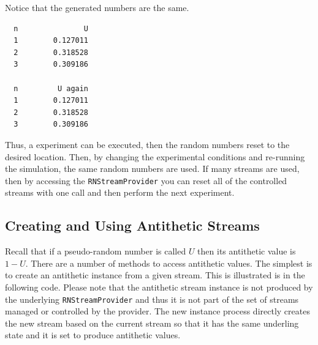 \documentclass[
]{book}
\theoremstyle{definition}
\theoremstyle{definition}
\theoremstyle{definition}
\theoremstyle{definition}
\theoremstyle{remark}
\begin{document}
Notice that the generated numbers are the same.

\begin{verbatim}
  n               U 
  1        0.127011 
  2        0.318528 
  3        0.309186 

  n         U again 
  1        0.127011 
  2        0.318528 
  3        0.309186 
\end{verbatim}

Thus, a experiment can be executed, then the random numbers reset to the desired location. Then, by changing the experimental conditions and re-running the simulation, the same random numbers are used. If many streams are used, then by accessing the \texttt{RNStreamProvider} you can reset all of the controlled streams with one call and then perform the next experiment.

\hypertarget{ch2:antitheticStreams}{%
\subsection{Creating and Using Antithetic Streams}\label{ch2:antitheticStreams}}

Recall that if a pseudo-random number is called \(U\) then its antithetic value is \(1-U\). There are a number of methods to access antithetic values. The simplest is to create an antithetic instance from a given stream. This is illustrated is in the following code. Please note that the antithetic stream instance is not produced by the underlying \texttt{RNStreamProvider} and thus it is not part of the set of streams managed or controlled by the provider. The new instance process directly creates the new stream based on the current stream so that it has the same underling state and it is set to produce antithetic values.
\end{document}
